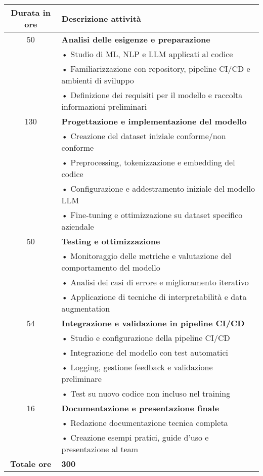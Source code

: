

\begin{tabularx}{\textwidth}{|c|X|}
    \hline
    \textbf{Durata in ore} & \textbf{Descrizione attività} \\
    \hline

    50 & \textbf{Analisi delle esigenze e preparazione} \\
       & • Studio di ML, NLP e LLM applicati al codice \\
       & • Familiarizzazione con repository, pipeline CI/CD e ambienti di sviluppo \\
       & • Definizione dei requisiti per il modello e raccolta informazioni preliminari \\
    \hline

    130 & \textbf{Progettazione e implementazione del modello} \\
        & • Creazione del dataset iniziale conforme/non conforme \\
        & • Preprocessing, tokenizzazione e embedding del codice \\
        & • Configurazione e addestramento iniziale del modello LLM \\
        & • Fine-tuning e ottimizzazione su dataset specifico aziendale \\
    \hline

    50 & \textbf{Testing e ottimizzazione} \\
       & • Monitoraggio delle metriche e valutazione del comportamento del modello \\
       & • Analisi dei casi di errore e miglioramento iterativo \\
       & • Applicazione di tecniche di interpretabilità e data augmentation \\
    \hline

    54 & \textbf{Integrazione e validazione in pipeline CI/CD} \\
       & • Studio e configurazione della pipeline CI/CD \\
       & • Integrazione del modello con test automatici \\
       & • Logging, gestione feedback e validazione preliminare \\
       & • Test su nuovo codice non incluso nel training \\
    \hline

    16 & \textbf{Documentazione e presentazione finale} \\
       & • Redazione documentazione tecnica completa \\
       & • Creazione esempi pratici, guide d’uso e presentazione al team \\
    \hline

    \textbf{Totale ore} & \textbf{300} \\
    \hline
\end{tabularx}